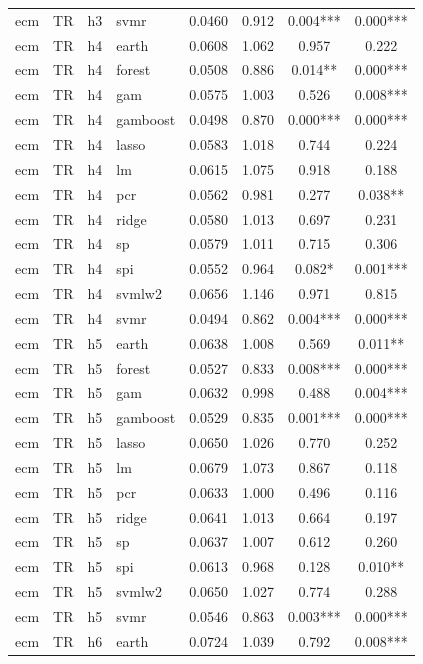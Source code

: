 \begin{ThreePartTable}
\begin{longtable}[t]{llclcccc}
ecm & TR & h3 & svmr & 0.0460 & 0.912 & 0.004*** & 0.000***\\
\addlinespace
ecm & TR & h4 & earth & 0.0608 & 1.062 & 0.957 & 0.222\\
ecm & TR & h4 & forest & 0.0508 & 0.886 & 0.014** & 0.000***\\
ecm & TR & h4 & gam & 0.0575 & 1.003 & 0.526 & 0.008***\\
ecm & TR & h4 & gamboost & 0.0498 & 0.870 & 0.000*** & 0.000***\\
ecm & TR & h4 & lasso & 0.0583 & 1.018 & 0.744 & 0.224\\
ecm & TR & h4 & lm & 0.0615 & 1.075 & 0.918 & 0.188\\
ecm & TR & h4 & pcr & 0.0562 & 0.981 & 0.277 & 0.038**\\
ecm & TR & h4 & ridge & 0.0580 & 1.013 & 0.697 & 0.231\\
ecm & TR & h4 & sp & 0.0579 & 1.011 & 0.715 & 0.306\\
ecm & TR & h4 & spi & 0.0552 & 0.964 & 0.082* & 0.001***\\
ecm & TR & h4 & svmlw2 & 0.0656 & 1.146 & 0.971 & 0.815\\
ecm & TR & h4 & svmr & 0.0494 & 0.862 & 0.004*** & 0.000***\\
\addlinespace
ecm & TR & h5 & earth & 0.0638 & 1.008 & 0.569 & 0.011**\\
ecm & TR & h5 & forest & 0.0527 & 0.833 & 0.008*** & 0.000***\\
ecm & TR & h5 & gam & 0.0632 & 0.998 & 0.488 & 0.004***\\
ecm & TR & h5 & gamboost & 0.0529 & 0.835 & 0.001*** & 0.000***\\
ecm & TR & h5 & lasso & 0.0650 & 1.026 & 0.770 & 0.252\\
ecm & TR & h5 & lm & 0.0679 & 1.073 & 0.867 & 0.118\\
ecm & TR & h5 & pcr & 0.0633 & 1.000 & 0.496 & 0.116\\
ecm & TR & h5 & ridge & 0.0641 & 1.013 & 0.664 & 0.197\\
ecm & TR & h5 & sp & 0.0637 & 1.007 & 0.612 & 0.260\\
ecm & TR & h5 & spi & 0.0613 & 0.968 & 0.128 & 0.010**\\
ecm & TR & h5 & svmlw2 & 0.0650 & 1.027 & 0.774 & 0.288\\
ecm & TR & h5 & svmr & 0.0546 & 0.863 & 0.003*** & 0.000***\\
\addlinespace
ecm & TR & h6 & earth & 0.0724 & 1.039 & 0.792 & 0.008***\\

\end{longtable}
\end{ThreePartTable}
